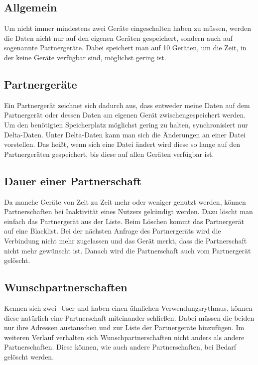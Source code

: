 \subsection{Allgemein}
Um nicht immer mindestens zwei Geräte eingeschalten haben zu müssen, werden die Daten nicht nur auf den eigenen Geräten gespeichert, sondern auch auf sogenannte Partnergeräte. Dabei speichert man auf 10 Geräten, um die Zeit, in der keine Geräte verfügbar sind, möglichst gering ist.

\subsection{Partnergeräte}
Ein Partnergerät zeichnet sich dadurch aus, dass entweder meine Daten auf dem Partnergerät oder dessen Daten am eigenen Gerät zwischengespeichert werden. Um den benötigten Speicherplatz möglichst gering zu halten, synchronisiert \sblit nur Delta-Daten. Unter Delta-Daten kann man sich die Änderungen an einer Datei vorstellen. Das heißt, wenn sich eine Datei ändert wird diese so lange auf den Partnergeräten gespeichert, bis diese auf allen Geräten verfügbar ist.

\subsection{Dauer einer Partnerschaft}
Da manche Geräte von Zeit zu Zeit mehr oder weniger genutzt werden, können Partnerschaften bei Inaktivität eines Nutzers gekündigt werden. Dazu löscht man einfach das Partnergerät aus der Liste. Beim Löschen kommt das Partnergerät auf eine Blacklist. Bei der nächsten Anfrage des Partnergeräts wird die Verbindung nicht mehr zugelassen und das Gerät merkt, dass die Partnerschaft nicht mehr gewünscht ist. Danach wird die Partnerschaft auch vom Partnergerät gelöscht.

\subsection{Wunschpartnerschaften}
Kennen sich zwei \sblit-User und haben einen ähnlichen Verwendungsrythmus, können diese natürlich eine Partnerschaft miteinander schließen. Dabei müssen die beiden nur ihre Adressen austauschen und zur Liste der Partnergeräte hinzufügen. Im weiteren Verlauf verhalten sich Wunschpartnerschaften nicht anders als andere Partnerschaften. Diese können, wie auch andere Partnerschaften, bei Bedarf gelöscht werden.

